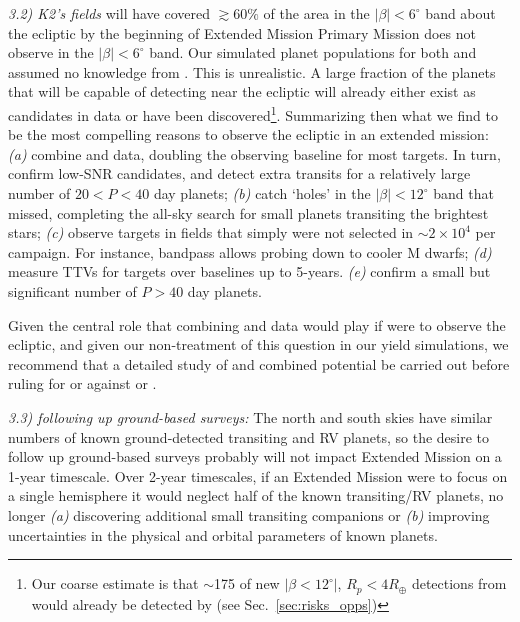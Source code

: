 \textit{3.2) K2's fields} will have covered $\gtrsim\!60\%$ of the area in the $|\beta|<6^\circ$ band about the ecliptic by the beginning of \tesss Extended Mission %
\tesss Primary Mission does not observe in the $|\beta|<6^\circ$ band. 
Our simulated planet populations for both \elong\:and \eshort\:assumed no knowledge from \ktwo\!.
This is unrealistic.
A large fraction of the planets that \tess will be capable of detecting near the ecliptic will already either exist as candidates in \ktwos data or have been discovered\footnote{Our coarse estimate is that $\sim$175 of  new $|\beta<12^\circ|$, $R_p<4R_\oplus$ detections from \elong\:would already be detected by \ktwo (see Sec.~\protect\ref{sec:risks_opps})}.
Summarizing then what we find to be the most compelling reasons to observe the ecliptic in an extended \tess mission:
\textit{(a)} combine \tess and \ktwo data, doubling the \ktwo observing baseline for most targets. In turn, confirm low-SNR candidates, and detect extra transits for a relatively large number of $20<P<40$ day planets;
\textit{(b)} catch `holes' in the $|\beta| < 12^\circ$ band that \ktwo missed, completing the all-sky search for small planets transiting the brightest stars;
\textit{(c)} observe targets in \ktwo fields that simply were not selected in \ktwos $\sim\!2\times10^4$ per campaign. For instance, \tesss bandpass allows probing down to cooler M dwarfs;
\textit{(d)} measure TTVs for targets over baselines up to 5-years.
\textit{(e)} confirm a small but significant number of $P>40$ day planets.

Given the central role that combining \tess and \ktwo data would play if \tess were to observe the ecliptic, and given our non-treatment of this question in our yield simulations, we recommend that a detailed study of \ktwo and \tesss combined potential be carried out before ruling for or against \elong\:or \eshort.

\textit{3.3) \tess following up ground-based surveys:}
The north and south skies have similar numbers of known ground-detected transiting and RV planets, so the desire to follow up ground-based surveys probably will not impact \tesss Extended Mission on a 1-year timescale.
Over 2-year timescales, if an Extended Mission were to focus on a single hemisphere it would neglect half of the known transiting/RV planets, no longer \textit{(a)} discovering additional small transiting companions %
or \textit{(b)} improving uncertainties in the physical and orbital parameters of known planets.



